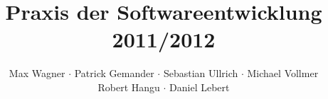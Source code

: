 \documentclass{article}
\begin{document}
\title{Praxis der Softwareentwicklung 2011/2012}
\author{Max Wagner $\cdot$ Patrick Gemander $\cdot$ Sebastian Ullrich $\cdot$ Michael Vollmer \\ Robert Hangu $\cdot$ Daniel Lebert}
\maketitle















\end{document}
